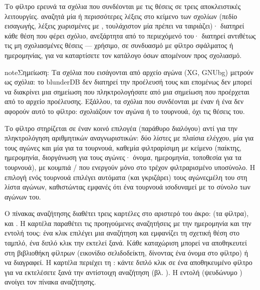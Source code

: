 \documentclass[letterpaper,10pt,greek]{sphinxmanual}
\begin{document}
\sphinxAtStartPar
Το φίλτρο  ερευνά τα σχόλια που συνδέονται με τις θέσεις σε τρεις αποκλειστικές λειτουργίες.  αναζητά μία ή περισσότερες λέξεις στο κείμενο των σχολίων (πεδίο εισαγωγής, λέξεις χωρισμένες με \sphinxcode{\sphinxupquote{;}}, τουλάχιστον μία πρέπει να ταιριάζει)·  διατηρεί κάθε θέση που φέρει σχόλιο, ανεξάρτητα από το περιεχόμενό του·  διατηρεί αντιθέτως τις μη σχολιασμένες θέσεις — χρήσιμο, σε συνδυασμό με φίλτρο σφάλματος ή ημερομηνίας, για να καταρτίσετε τον κατάλογο όσων απομένουν προς σχολιασμό.

\begin{sphinxadmonition}{note}{Σημείωση:}
\sphinxAtStartPar
Τα σχόλια που εισάγονται από αρχείο αγώνα (XG, GNUbg) μετρούν ως σχόλια: το blunderDB δεν διατηρεί την προέλευσή τους και επομένως δεν μπορεί να διακρίνει μια σημείωση που πληκτρολογήσατε από μια σημείωση που προέρχεται από το αρχείο προέλευσης. Εξάλλου, τα σχόλια που συνδέονται με έναν  ή ένα  δεν αφορούν αυτό το φίλτρο: σχολιάζουν τον αγώνα ή το τουρνουά, όχι τις θέσεις του.
\end{sphinxadmonition}

\sphinxAtStartPar
Το φίλτρο  στηρίζεται σε έναν κοινό επιλογέα (παράθυρο διαλόγου) αντί για την πληκτρολόγηση αριθμητικών αναγνωριστικών: δύο λίστες με πλαίσια ελέγχου, μία για τους αγώνες και μία για τα τουρνουά, καθεμία φιλτραρίσιμη με κείμενο (παίκτης, ημερομηνία, διοργάνωση για τους αγώνες· όνομα, ημερομηνία, τοποθεσία για τα τουρνουά), με κουμπιά  /  που ενεργούν μόνο στο τρέχον φιλτραρισμένο υποσύνολο. Η επιλογή ενός τουρνουά επιλέγει αυτόματα (και γκριζάρει) τους αγώνες\sphinxhyphen{}μέλη του στη λίστα αγώνων, καθιστώντας εμφανές ότι ένα τουρνουά ισοδυναμεί με το σύνολο των αγώνων του.

\sphinxAtStartPar
Ο πίνακας αναζήτησης διαθέτει τρεις καρτέλες στο αριστερό του άκρο:  (τα φίλτρα),  και . Η καρτέλα  παραθέτει τις προηγούμενες αναζητήσεις με την ημερομηνία και την εντολή τους: ένα κλικ επιλέγει μια αναζήτηση και εμφανίζει τη σχετική θέση στο ταμπλό, ένα διπλό κλικ την εκτελεί ξανά. Κάθε καταχώριση μπορεί να αποθηκευτεί στη βιβλιοθήκη φίλτρων (εικονίδιο σελιδοδείκτη, δίνοντας ένα όνομα στο φίλτρο) ή να διαγραφεί. Η καρτέλα  περιέχει τη : κάντε διπλό κλικ σε ένα αποθηκευμένο φίλτρο για να εκτελέσετε ξανά την αντίστοιχη αναζήτηση (βλ. {\hyperref[\detokenize{annexe_filtres:annexe-filtres}]{}}). Η εντολή  (ψευδώνυμο ) ανοίγει τον πίνακα αναζήτησης.
\end{document}

